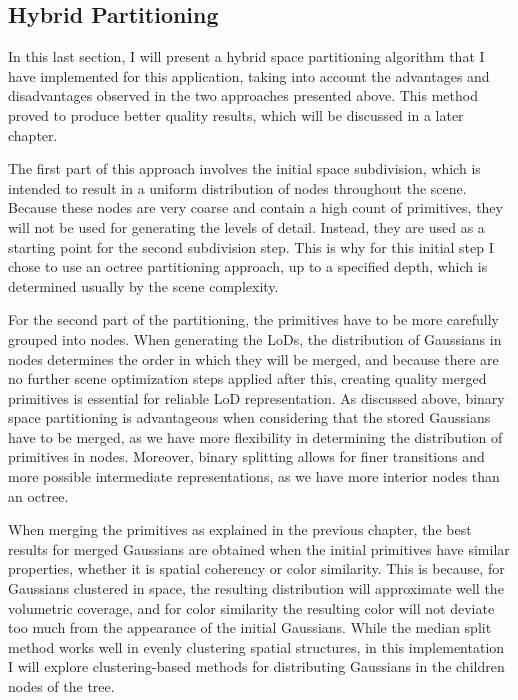 \subsection{Hybrid Partitioning}
In this last section, I will present a hybrid space partitioning algorithm that I have implemented for this application, taking into account the advantages and disadvantages observed in the two approaches presented above. This method proved to produce better quality results, which will be discussed in a later chapter.

The first part of this approach involves the initial space subdivision, which is intended to result in a uniform distribution of nodes throughout the scene. Because these nodes are very coarse and contain a high count of primitives, they will not be used for generating the levels of detail. Instead, they are used as a starting point for the second subdivision step. This is why for this initial step I chose to use an octree partitioning approach, up to a specified depth, which is determined usually by the scene complexity.

For the second part of the partitioning, the primitives have to be more carefully grouped into nodes. When generating the LoDs, the distribution of Gaussians in nodes determines the order in which they will be merged, and because there are no further scene optimization steps applied after this, creating quality merged primitives is essential for reliable LoD representation. As discussed above, binary space partitioning is advantageous when considering that the stored Gaussians have to be merged, as we have more flexibility in determining the distribution of primitives in nodes. Moreover, binary splitting allows for finer transitions and more possible intermediate representations, as we have more interior nodes than an octree. 

When merging the primitives as explained in the previous chapter, the best results for merged Gaussians are obtained when the initial primitives have similar properties, whether it is spatial coherency or color similarity. This is because, for Gaussians clustered in space, the resulting distribution will approximate well the volumetric coverage, and for color similarity the resulting color will not deviate too much from the appearance of the initial Gaussians. While the median split method works well in evenly clustering spatial structures, in this implementation I will explore clustering-based methods for distributing Gaussians in the children nodes of the tree.

